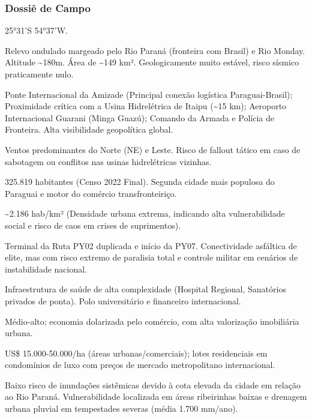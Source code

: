 \subsubsection{Dossiê de Campo}
\begin{description}[style=nextline,leftmargin=0.5cm,font=\bfseries]
\item[Coordenadas]  25°31'S 54°37'W.
\item[Topografia]  Relevo ondulado margeado pelo Rio Paraná (fronteira com Brasil) e Rio Monday. Altitude \textasciitilde 180m. Área de \textasciitilde 149 km². Geologicamente muito estável, risco sísmico praticamente nulo.
\item[Alvos Estratégicos]  Ponte Internacional da Amizade (Principal conexão logística Paraguai-Brasil); Proximidade crítica com a Usina Hidrelétrica de Itaipu (\textasciitilde 15 km); Aeroporto Internacional Guarani (Minga Guazú); Comando da Armada e Polícia de Fronteira. Alta visibilidade geopolítica global.
\item[Fallout]  Ventos predominantes do Norte (NE) e Leste. Risco de fallout tático em caso de sabotagem ou conflitos nas usinas hidrelétricas vizinhas.
\item[População]  325.819 habitantes (Censo 2022 Final). Segunda cidade mais populosa do Paraguai e motor do comércio transfronteiriço.
\item[Densidade]  \textasciitilde 2.186 hab/\allowbreak km² (Densidade urbana extrema, indicando alta vulnerabilidade social e risco de caos em crises de suprimentos).
\item[Vias de Acesso]  Terminal da Ruta PY02 duplicada e início da PY07. Conectividade asfáltica de elite, mas com risco extremo de paralisia total e controle militar em cenários de instabilidade nacional.
\item[Serviços]  Infraestrutura de saúde de alta complexidade (Hospital Regional, Sanatórios privados de ponta). Polo universitário e financeiro internacional.
\item[Custo de Vida]  Médio-alto; economia dolarizada pelo comércio, com alta valorização imobiliária urbana.
\item[Preço da Terra]  US\$ 15.000-50.000/\allowbreak ha (áreas urbanas/\allowbreak comerciais); lotes residenciais em condomínios de luxo com preços de mercado metropolitano internacional.
\item[Hidrologia]  Baixo risco de inundações sistêmicas devido à cota elevada da cidade em relação ao Rio Paraná. Vulnerabilidade localizada em áreas ribeirinhas baixas e drenagem urbana pluvial em tempestades severas (média 1.700 mm/\allowbreak ano).

\end{description}
